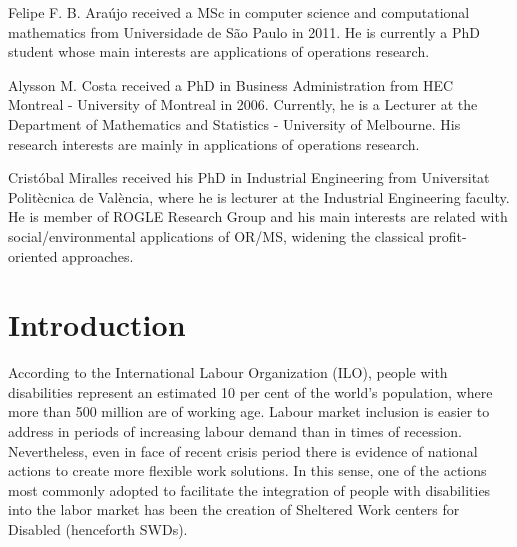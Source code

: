\documentclass{singlecol-new}
\begin{document}


\begin{bio}
Felipe F. B. Ara\'ujo received a MSc in computer science and computational mathematics from Universidade de S\~ao Paulo in 2011. He is currently a PhD student whose main interests are applications of operations research.

\noindent Alysson M. Costa received a PhD in Business Administration from HEC Montreal - University of Montreal in 2006. Currently, he is a Lecturer at the Department of Mathematics and Statistics - University of Melbourne. His research interests are mainly in applications of operations research.

\noindent Crist\'obal Miralles received his PhD in Industrial Engineering from Universitat Polit\`ecnica de Val\`encia, where he is lecturer at the Industrial Engineering faculty. He is member of ROGLE Research Group and his main interests are related with social/environmental applications of OR/MS, widening the classical profit-oriented approaches.
\end{bio}


\maketitle


\section{Introduction}\label{introduction}

According to the International Labour Organization (ILO), people with disabilities represent an estimated 10 per cent of the world's population, where more than 500 million are of working age. Labour market inclusion is easier to address in periods of increasing labour demand than in times of recession. Nevertheless, even in face of recent crisis period there is evidence of national actions to create more flexible work solutions. In this sense, one of the actions most commonly adopted to facilitate the integration of people with disabilities into the labor market has been the creation of Sheltered Work centers for Disabled (henceforth SWDs).
\end{document}
